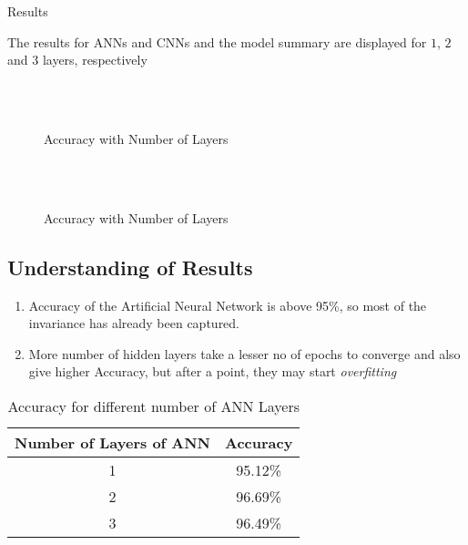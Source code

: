 \documentclass{article}
\begin{document}
\begin{section}{Results}

The results for ANNs and CNNs and the model summary are displayed for $1$, $2$ and $3$ layers, respectively

    \begin{figure}[H]
        \\
        \\
        \caption{Accuracy with Number of Layers}
    \end{figure}

    \begin{figure}[H]
        \\
        \\
        \caption{Accuracy with Number of Layers}
    \end{figure}

\end{section}
\subsection{Understanding of Results}

\begin{enumerate}
		
	\item Accuracy of the Artificial Neural Network is above 95\%, so most of the invariance has already been captured.
    \item More number of hidden layers take a lesser no of epochs to converge and also give higher Accuracy,
    but after a point, they may start \emph{overfitting}
\end{enumerate}

\begin{table}[H]
	\begin{tabular}{|c|c|} \hline
		Number of Layers of ANN & Accuracy \\ \hline
		1                               & 95.12\%  \\ \hline
		2                               & 96.69\%  \\ \hline
		3                               & 96.49\%  \\ \hline
	\end{tabular}
	\caption{Accuracy for different number of ANN Layers}
\end{table}
\end{document}
